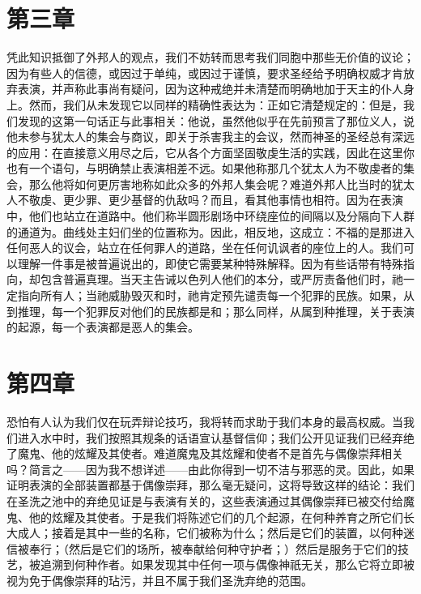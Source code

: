 
\section{第三章}

凭此知识抵御了外邦人的观点，我们不妨转而思考我们同胞中那些无价值的议论；因为有些人的信德，或因过于单纯，或因过于谨慎，要求圣经给予明确权威才肯放弃表演，并声称此事尚有疑问，因为这种戒绝并未清楚而明确地加于天主的仆人身上。然而，我们从未发现它以同样的精确性表达为：正如它清楚规定的：但是，我们发现的这第一句话正与此事相关：他说，虽然他似乎在先前预言了那位义人，说他未参与犹太人的集会与商议，即关于杀害我主的会议，然而神圣的圣经总有深远的应用：在直接意义用尽之后，它从各个方面坚固敬虔生活的实践，因此在这里你也有一个语句，与明确禁止表演相差不远。如果他称那几个犹太人为不敬虔者的集会，那么他将如何更厉害地称如此众多的外邦人集会呢？难道外邦人比当时的犹太人不敬虔、更少罪、更少基督的仇敌吗？而且，看其他事情也相符。因为在表演中，他们也站立在道路中。他们称半圆形剧场中环绕座位的间隔以及分隔向下人群的通道为。曲线处主妇们坐的位置称为。因此，相反地，这成立：不福的是那进入任何恶人的议会，站立在任何罪人的道路，坐在任何讥讽者的座位上的人。我们可以理解一件事是被普遍说出的，即使它需要某种特殊解释。因为有些话带有特殊指向，却包含普遍真理。当天主告诫以色列人他们的本分，或严厉责备他们时，祂一定指向所有人；当祂威胁毁灭和时，祂肯定预先谴责每一个犯罪的民族。如果，从到推理，每一个犯罪反对他们的民族都是和；那么同样，从属到种推理，关于表演的起源，每一个表演都是恶人的集会。\par


\section{第四章}

恐怕有人认为我们仅在玩弄辩论技巧，我将转而求助于我们本身的最高权威。当我们进入水中时，我们按照其规条的话语宣认基督信仰；我们公开见证我们已经弃绝了魔鬼、他的炫耀及其使者。难道魔鬼及其炫耀和使者不是首先与偶像崇拜相关吗？简言之——因为我不想详述——由此你得到一切不洁与邪恶的灵。因此，如果证明表演的全部装置都基于偶像崇拜，那么毫无疑问，这将导致这样的结论：我们在圣洗之池中的弃绝见证是与表演有关的，这些表演通过其偶像崇拜已被交付给魔鬼、他的炫耀及其使者。于是我们将陈述它们的几个起源，在何种养育之所它们长大成人；接着是其中一些的名称，它们被称为什么；然后是它们的装置，以何种迷信被奉行；（然后是它们的场所，被奉献给何种守护者；）然后是服务于它们的技艺，被追溯到何种作者。如果发现其中任何一项与偶像神祇无关，那么它将立即被视为免于偶像崇拜的玷污，并且不属于我们圣洗弃绝的范围。\par

